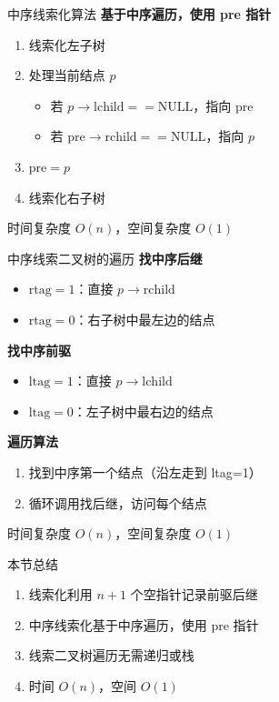 \documentclass[10pt, aspectratio=169]{beamer}
\begin{document}
\begin{frame}{中序线索化算法}
    \textbf{基于中序遍历，使用 pre 指针}
    \vspace{0.3em}
    \begin{enumerate}
        \item 线索化左子树
        \item 处理当前结点 $p$
        \begin{itemize}
            \item 若 $p \to \text{lchild} == \text{NULL}$，指向 pre
            \item 若 $\text{pre} \to \text{rchild} == \text{NULL}$，指向 $p$
        \end{itemize}
        \item $\text{pre} = p$
        \item 线索化右子树
    \end{enumerate}
    \vspace{0.3em}
    时间复杂度 $O(n)$，空间复杂度 $O(1)$
\end{frame}

\begin{frame}{中序线索二叉树的遍历}
    \textbf{找中序后继}
    \begin{itemize}
        \item $\text{rtag} = 1$：直接 $p \to \text{rchild}$
        \item $\text{rtag} = 0$：右子树中最左边的结点
    \end{itemize}
    \vspace{0.3em}
    \textbf{找中序前驱}
    \begin{itemize}
        \item $\text{ltag} = 1$：直接 $p \to \text{lchild}$
        \item $\text{ltag} = 0$：左子树中最右边的结点
    \end{itemize}
    \vspace{0.3em}
    \textbf{遍历算法}
    \begin{enumerate}
        \item 找到中序第一个结点（沿左走到 ltag=1）
        \item 循环调用找后继，访问每个结点
    \end{enumerate}
    时间复杂度 $O(n)$，空间复杂度 $O(1)$
\end{frame}

\begin{frame}{本节总结}
    \begin{enumerate}
        \item 线索化利用 $n+1$ 个空指针记录前驱后继
        \item 中序线索化基于中序遍历，使用 pre 指针
        \item 线索二叉树遍历无需递归或栈
        \item 时间 $O(n)$，空间 $O(1)$
    \end{enumerate}
\end{frame}
\end{document}
